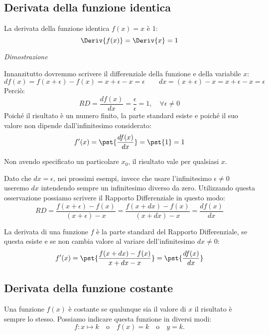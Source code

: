 \subsection{Derivata della funzione identica}
\label{subsec:differenziazione_derivatafidentica}
\begin{teorema}
La derivata della funzione identica \(f(x)=x\) è \(1\):
\[\Deriv{f(x)} = \Deriv{x} = 1\]
\end{teorema}
\emph{Dimostrazione}

Innanzitutto dovremmo scrivere il differenziale della funzione e della 
variabile \(x\): 
\[df(x)=f(x+\epsilon)-f(x)=x+\epsilon-x=\epsilon \qquad 
  dx = (x +\epsilon) -x = x +\epsilon -x = \epsilon\] 
Perciò: 
\[RD = \dfrac{df(x)}{dx}=\dfrac{\epsilon}{\epsilon}=1, \quad 
\forall \epsilon \ne 0\]
Poiché il risultato è un numero finito, la parte standard esiste e 
poiché il suo valore non dipende dall'infinitesimo considerato:
\[f'(x)=\pst{\dfrac{df(x)}{dx}}=\pst{1}=1\]

\begin{osservazione}
Non avendo specificato un particolare \(x_0\), il risultato vale per 
qualsiasi \(x\).
\end{osservazione}

Dato che \(dx = \epsilon\), nei prossimi esempi, invece che usare 
l'infinitesimo \(\epsilon \neq 0\) useremo \(dx\) intendendo sempre un 
infinitesimo diverso da zero.
Utilizzando questa osservazione possiamo scrivere il 
Rapporto Differenziale in questo modo: 
\[RD = \dfrac{f(x +\epsilon) -f(x)}{(x +\epsilon) -x} = 
       \dfrac{f(x +dx) -f(x)}{(x +dx) -x} = 
       \dfrac{df(x)}{dx}\]
\begin{definizione}
 La derivata di una funzione \(f\) è la parte standard del Rapporto 
Differenziale, se questa esiste e se non cambia valore al variare 
dell'infinitesimo \(dx \neq 0\):
\[f'(x) = \pst{\dfrac{f(x +dx) -f(x)}{x +dx -x}}=
  \pst{\frac{df(x)}{dx}}\]
\end{definizione}

\subsection{Derivata della funzione costante}
\label{subsec:differenziazione_derivatafcostante}
Una funzione \(f(x)\) è costante se qualunque sia il valore di \(x\) il 
risultato è sempre lo stesso. Possiamo indicare questa funzione in diversi 
modi:
\[f: x \mapsto k \quad \text{o} \quad f(x)=k \quad \text{o} \quad y = k.\]

